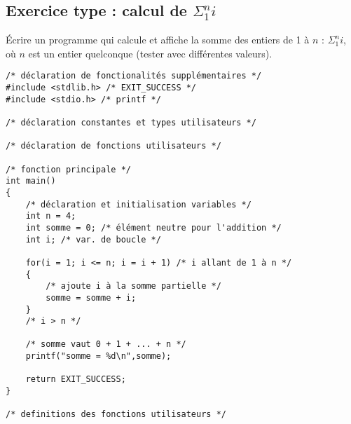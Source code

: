 \subsection{Exercice type : calcul de $\Sigma_1^n i$}

Écrire un programme  qui calcule et affiche la somme des entiers de 1 à
$n$ : $\Sigma_1^n i$, où $n$ est un entier quelconque (tester avec
différentes valeurs).

\begin{correction}
\begin{verbatim}
/* déclaration de fonctionalités supplémentaires */
#include <stdlib.h> /* EXIT_SUCCESS */
#include <stdio.h> /* printf */

/* déclaration constantes et types utilisateurs */

/* déclaration de fonctions utilisateurs */

/* fonction principale */
int main()
{
    /* déclaration et initialisation variables */
    int n = 4;
    int somme = 0; /* élément neutre pour l'addition */
    int i; /* var. de boucle */

    for(i = 1; i <= n; i = i + 1) /* i allant de 1 à n */
    {
        /* ajoute i à la somme partielle */
        somme = somme + i;
    }
    /* i > n */

    /* somme vaut 0 + 1 + ... + n */
    printf("somme = %d\n",somme);

    return EXIT_SUCCESS;
}

/* definitions des fonctions utilisateurs */
\end{verbatim}
\end{correction}

